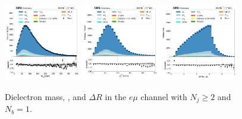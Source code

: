 \begin{figure}[htb!]
    \centering
    \includegraphics[width=0.3\textwidth]{chapters/Analysis/sectionPlots/figures/data_mc_overlays/emu_2016_cat_gt2_eq1_a_signal_linear_lepton_dilepton1_mass}
    \includegraphics[width=0.3\textwidth]{chapters/Analysis/sectionPlots/figures/data_mc_overlays/emu_2016_cat_gt2_eq1_a_signal_linear_lepton_dilepton1_pt}
    \includegraphics[width=0.3\textwidth]{chapters/Analysis/sectionPlots/figures/data_mc_overlays/emu_2016_cat_gt2_eq1_a_signal_linear_lepton_dilepton1_delta_r}
    \caption{Dielectron mass, \pt, and $\Delta R$ in the $e\mu$ channel
    with $N_{j} \geq 2$ and $N_{b} = 1$.}
    \label{fig:analysis:plots:emu_5_dilepton}
\end{figure}

